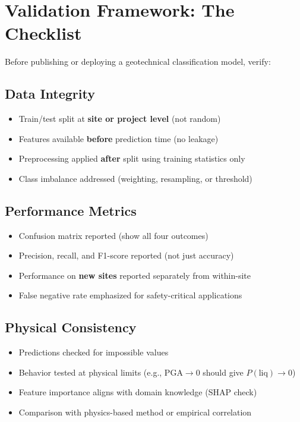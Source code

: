 \documentclass[12pt]{article}
\begin{document}
\newpage
\appendix
\section{Validation Framework: The Checklist}

Before publishing or deploying a geotechnical classification model, verify:

\subsection{Data Integrity}
\begin{itemize}
\item[$\square$] Train/test split at \textbf{site or project level} (not random)
\item[$\square$] Features available \textbf{before} prediction time (no leakage)
\item[$\square$] Preprocessing applied \textbf{after} split using training statistics only
\item[$\square$] Class imbalance addressed (weighting, resampling, or threshold)
\end{itemize}

\subsection{Performance Metrics}
\begin{itemize}
\item[$\square$] Confusion matrix reported (show all four outcomes)
\item[$\square$] Precision, recall, and F1-score reported (not just accuracy)
\item[$\square$] Performance on \textbf{new sites} reported separately from within-site
\item[$\square$] False negative rate emphasized for safety-critical applications
\end{itemize}

\subsection{Physical Consistency}
\begin{itemize}
\item[$\square$] Predictions checked for impossible values
\item[$\square$] Behavior tested at physical limits (e.g., $\text{PGA} \to 0$ should give $P(\text{liq}) \to 0$)
\item[$\square$] Feature importance aligns with domain knowledge (SHAP check)
\item[$\square$] Comparison with physics-based method or empirical correlation
\end{itemize}
\end{document}
